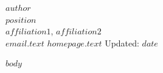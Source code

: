 \documentclass[11pt]{article}
\begin{document}
\raggedright
{}\selectfont

\begin{center}
  {\Huge $author$ } \\[.75em]
  $position$ \\ 
  $affiliation1$, $affiliation2$ \\
  \href{$email.url$}{$email.text$} \quad 
  \href{$homepage.url$}{$homepage.text$} \quad
  Updated: $date$ 
\end{center}

$body$
\end{document}
